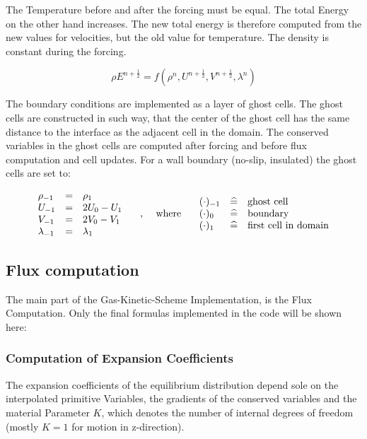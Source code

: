 \documentclass[
	pdftex,             %
	12pt,				%
	a4paper,		   	%
	english,				%
	oneside,			%
]{article}
\begin{document}
The Temperature before and after the forcing must be equal. The total Energy on the other hand increases. The new total energy is therefore computed from the new values for velocities, but the old value for temperature. The density is constant during the forcing.

\begin{equation}
\rho E^{n+\frac{1}{2}} = f(\rho^n, U^{n+\frac{1}{2}}, V^{n+\frac{1}{2}}, \lambda^n)
\end{equation}

The boundary conditions are implemented as a layer of ghost cells. The ghost cells are constructed in such way, that the center of the ghost cell has the same distance to the interface as the adjacent cell in the domain. The conserved variables in the ghost cells are computed after forcing and before flux computation and cell updates. For a wall boundary (no-slip, insulated) the ghost cells are set to:

\begin{equation}
\begin{array}{lcl}
\rho_{-1} &=& \rho_{1} \\
U_{-1} &=& 2 U_{0} - U_{1} \\
V_{-1} &=& 2 V_{0} - V_{1} \\
\lambda_{-1} &=& \lambda_{1}
\end{array}
\textnormal{~~~~,~~~~where~~~~}
\begin{array}{lcl}
(\cdot)_{-1} &\widehat{=}& \textnormal{ghost cell} \\
(\cdot)_0 &\widehat{=}& \textnormal{boundary} \\
(\cdot)_1 &\widehat{=}& \textnormal{first cell in domain}
\end{array}
\end{equation}

\subsection{Flux computation}

The main part of the Gas-Kinetic-Scheme Implementation, is the Flux Computation. Only the final formulas implemented in the code will be shown here:

\subsubsection{Computation of Expansion Coefficients}

The expansion coefficients of the equilibrium distribution depend sole on the interpolated primitive Variables, the gradients of the conserved variables and the material Parameter $K$, which denotes the number of internal degrees of freedom (mostly $K=1$ for motion in z-direction). 
\end{document}
